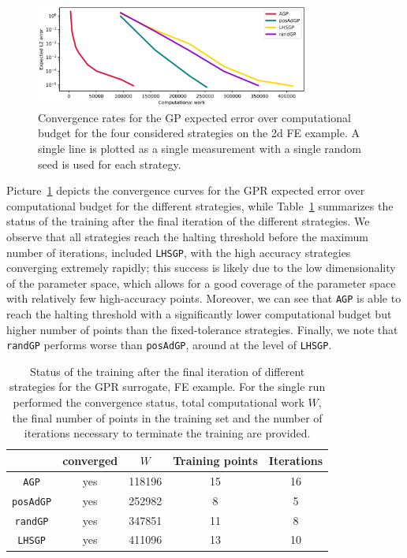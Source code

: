 \begin{figure}[H]
    \begin{center}
        \includegraphics[width=0.8\textwidth]{results/pictures/d2/GP_res.png}
    \end{center}
    \caption{Convergence rates for the GP expected error over computational budget for the four considered strategies on the 2d FE example. A single line is plotted as a single measurement with a single random seed is used for each strategy.}
        \label{fig:FE-GP-convergence}
\end{figure}

Picture~\ref{fig:FE-GP-convergence} depicts the convergence curves for the GPR expected error over computational budget for the different strategies, while Table~\ref{tab:FE-GP-recap} summarizes the status of the training after the final iteration of the different strategies.
We observe that all strategies reach the halting threshold before the maximum number of iterations, included \texttt{LHSGP}, with the high accuracy strategies converging extremely rapidly; this success is likely due to the low dimensionality of the parameter space, which allows for a good coverage of the parameter space with relatively few high-accuracy points.
Moreover, we can see that \texttt{AGP} is able to reach the halting threshold with a significantly lower computational budget but higher number of points than the fixed-tolerance strategies.
Finally, we note that \texttt{randGP} performs worse than \texttt{posAdGP}, around at the level of \texttt{LHSGP}.
\begin{table}[H]
    \begin{centering}
    \begin{tabular}{ccccc}
    \toprule
        & converged   & $W$ & Training points    & Iterations \\ 
        \midrule
        \texttt{AGP}  
        & yes & 118196 &  15   &  16  \\
        \texttt{posAdGP}
        & yes & 252982 &  8   &  5  \\
        \texttt{randGP}
        & yes & 347851 &  11   &  8  \\
        \texttt{LHSGP}
        & yes & 411096 &  13   &  10  \\
    \bottomrule
    \end{tabular}
    \caption{Status of the training after the final iteration of different strategies for the GPR surrogate, FE example. For the single run performed the convergence status, total computational work $W$, the final number of points in the training set and the number of iterations necessary to terminate the training are provided.
    }
    \label{tab:FE-GP-recap}
\end{centering}
\end{table} 

